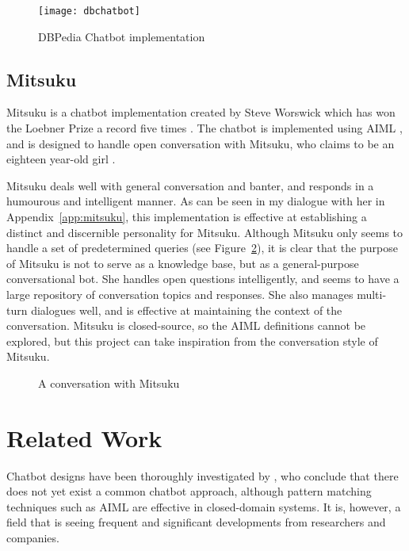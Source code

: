 \begin{figure}[h]
	\centering
	\texttt{[image: dbchatbot]}
	\caption{DBPedia Chatbot implementation \cite{ramngongausbeck2018}}
	\label{fig:dbchatbot}
\end{figure}

\newpage
\subsection{Mitsuku}
\label{subsec:Mitsuku}
Mitsuku is a chatbot implementation created by Steve Worswick \cite{worswick2018mitsuku} which has won the Loebner Prize a record five times \cite{aisb2019}. The chatbot is implemented using AIML \cite{higashinaka2014towards}, and is designed to handle open conversation with Mitsuku, who claims to be an eighteen year-old girl \cite{abdul2015survey}.

Mitsuku deals well with general conversation and banter, and responds in a humourous and intelligent manner. As can be seen in my dialogue with her in Appendix~\ref{app:mitsuku}, this implementation is effective at establishing a distinct and discernible personality for Mitsuku. Although Mitsuku only seems to handle a set of predetermined queries (see Figure~\ref{fig:mitsuku}), it is clear that the purpose of Mitsuku is not to serve as a knowledge base, but as a general-purpose conversational bot. She handles open questions intelligently, and seems to have a large repository of conversation topics and responses. She also manages multi-turn dialogues well, and is effective at maintaining the context of the conversation. Mitsuku is closed-source, so the AIML definitions cannot be explored, but this project can take inspiration from the conversation style of Mitsuku.

\begin{figure}[h]
	\centering
	\qquad
	\caption{A conversation with Mitsuku}
	\label{fig:mitsuku}
\end{figure}


\newpage
\section{Related Work}
Chatbot designs have been thoroughly investigated by \citet{abdul2015survey}, who conclude that there does not yet exist a common chatbot approach, although pattern matching techniques such as AIML are effective in closed-domain systems. It is, however, a field that is seeing frequent and significant developments from researchers and companies.

